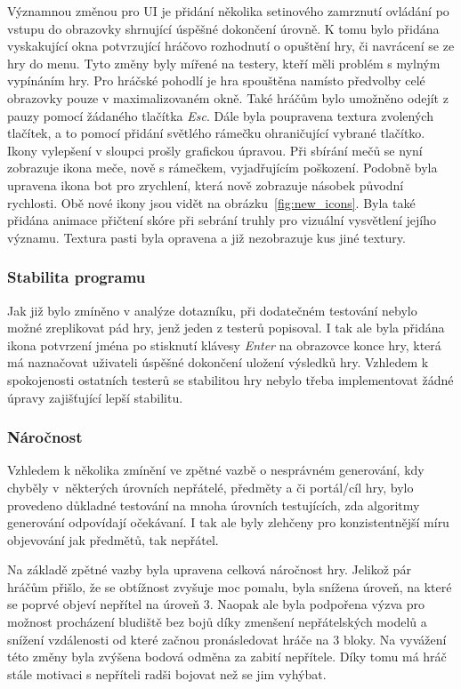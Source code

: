 Významnou změnou pro UI je přidání několika setinového zamrznutí ovládání po vstupu do obrazovky shrnující úspěšné dokončení úrovně. K tomu bylo přidána vyskakující okna potvrzující hráčovo rozhodnutí o opuštění hry, či navrácení se ze hry do menu. Tyto změny byly mířené na testery, kteří měli problém s mylným vypínáním hry. Pro hráčské pohodlí je hra spouštěna namísto předvolby celé obrazovky pouze v maximalizovaném okně. Také hráčům bylo umožněno odejít z pauzy pomocí žádaného tlačítka \textit{Esc}. Dále byla poupravena textura zvolených tlačítek, a to pomocí přidání světlého rámečku ohraničující vybrané tlačítko.
Ikony vylepšení v sloupci  prošly grafickou úpravou. Při sbírání mečů se nyní zobrazuje ikona meče, nově s rámečkem, vyjadřujícím poškození. Podobně byla upravena ikona bot pro zrychlení, která nově zobrazuje násobek původní rychlosti. Obě nové ikony jsou vidět na obrázku~\ref{fig:new_icons}. Byla také přidána animace přičtení skóre při sebrání truhly pro vizuální vysvětlení jejího významu. Textura pasti byla opravena a již nezobrazuje kus jiné textury.

\subsubsection*{\textbullet Stabilita programu}
Jak již bylo zmíněno v analýze dotazníku, při dodatečném testování nebylo možné zreplikovat pád hry, jenž jeden z testerů popisoval. I tak ale byla přidána ikona potvrzení jména po stisknutí klávesy \textit{Enter} na obrazovce konce hry, která má naznačovat uživateli úspěšné dokončení uložení výsledků hry. Vzhledem k spokojenosti ostatních testerů se stabilitou hry nebylo třeba implementovat žádné úpravy zajišťující lepší stabilitu.

\subsubsection*{\textbullet Náročnost}
Vzhledem k několika zmínění ve zpětné vazbě o nesprávném generování, kdy chyběly v~některých úrovních nepřátelé, předměty a či portál/cíl hry, bylo provedeno důkladné testování na mnoha úrovních testujících, zda algoritmy generování odpovídají očekávaní. I tak ale byly zlehčeny pro konzistentnější míru objevování jak předmětů, tak nepřátel.

Na základě zpětné vazby byla upravena celková náročnost hry. Jelikož pár hráčům přišlo, že se obtížnost zvyšuje moc pomalu, byla snížena úroveň, na které se poprvé objeví nepřítel na úroveň 3. Naopak ale byla podpořena výzva pro možnost procházení bludiště bez bojů díky zmenšení nepřátelských modelů a snížení vzdálenosti od které začnou pronásledovat hráče na 3 bloky. Na vyvážení této změny byla zvýšena bodová odměna za zabití nepřítele. Díky tomu má hráč stále motivaci s nepříteli radši bojovat než se jim vyhýbat.

